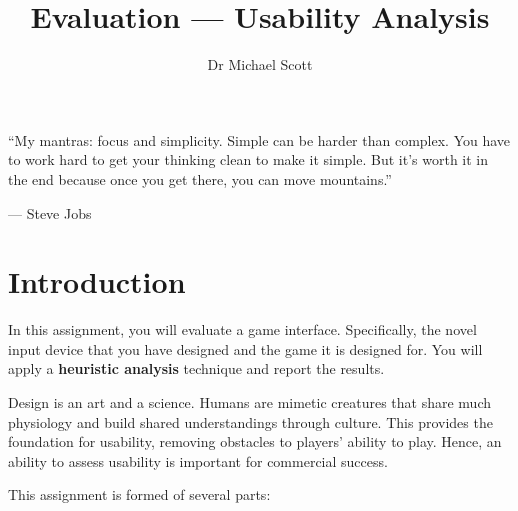 \documentclass{../fal_assignment}
\title{Evaluation --- Usability Analysis}
\author{Dr Michael Scott}
\begin{document}
\maketitle
\begin{marginquote}
    ``My mantras: focus and simplicity. Simple can be harder than complex. You have to work hard to get your thinking clean to make it simple. But it's worth it in the end because once you get there, you can move mountains.''
    
    --- Steve Jobs
\end{marginquote}
\section*{Introduction}

In this assignment, you will evaluate a game interface. Specifically, the novel input device that you have designed and the game it is designed for. You will apply a \textbf{heuristic analysis} technique and report the results.

Design is an art and a science. Humans are mimetic creatures that share much physiology and build shared understandings through culture. This provides the foundation for usability, removing obstacles to players' ability to play. Hence, an ability to assess usability is important for commercial success.

This assignment is formed of several parts:
\end{document}
